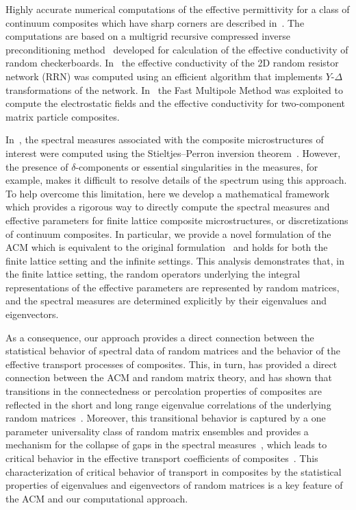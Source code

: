 \documentclass{cmslatex}
\begin{document}
Highly accurate numerical computations of the effective permittivity
for a class of continuum composites which have sharp corners are
described in~\cite{Helsing:NJP:115005}. The computations are based on
a multigrid recursive compressed inverse preconditioning
method~\cite{Helsing:2008:8820,Helsing:JCP:1171,Helsing:JCP:7533}
developed  
for calculation of the effective conductivity of random
checkerboards. In~\cite{Day:JPCM-96} the effective 
conductivity of the 2D random resistor network (RRN) 
was computed using an efficient algorithm that implements $Y$-$\Delta$
transformations of the
network. In~\cite{Greengard:1994:379,Cheng:1997:629,Greengard:2006:64}
the Fast 
Multipole Method was exploited to compute the electrostatic fields and
the effective conductivity for two-component matrix particle
composites.      


In~\cite{Helsing:NJP:115005,Day:JPCM-96}, the spectral measures
associated with the composite microstructures of interest were
computed using the Stieltjes--Perron inversion
theorem~\cite{Henrici:1974:v2,MILTON:2002:TC}. However, the  
presence of $\delta$-components or essential singularities in the
measures, for example, makes it difficult to resolve details of the
spectrum using this approach. To help overcome this limitation, here
we develop a mathematical framework which provides a rigorous way to
directly compute the spectral measures and effective parameters for
finite lattice composite microstructures, or discretizations of
continuum composites. In particular, we provide a novel
formulation of the ACM which is equivalent to
the original formulation~\cite{Golden:CMP-473} and
holds for both the finite lattice setting and the infinite
settings. This analysis demonstrates that, in the finite lattice
setting, the random operators underlying the integral representations
of the effective parameters are represented by random matrices, and
the spectral measures are determined explicitly by their eigenvalues
and eigenvectors.   



As a consequence,
our approach provides a direct connection between the statistical
behavior of spectral data of random matrices and the behavior of the
effective transport processes of composites. This, in turn, has
provided a direct connection between the ACM and random matrix theory, 
and has shown that transitions in the connectedness or percolation
properties of composites are reflected in the short and long range
eigenvalue correlations of the underlying random
matrices~\cite{Murphy:PHD_Thesis,Murphy_RMT_of_Composites}. Moreover,
this 
transitional behavior is captured by a one parameter universality
class of random matrix ensembles and provides a mechanism for the
collapse of gaps in the spectral
measures~\cite{Murphy:PHD_Thesis,Murphy_RMT_of_Composites}, which
leads to  
critical behavior in the effective transport coefficients of
composites~\cite{Murphy:JMP:063506}. This characterization of critical
behavior of transport in composites by the statistical properties of
eigenvalues and eigenvectors of random matrices is a key feature of
the ACM and our computational approach. 
\end{document}
